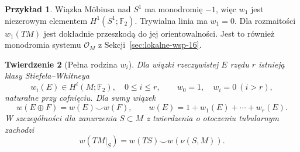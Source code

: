 \documentclass[11pt,a4paper,oneside]{report}
\theoremstyle{plain}
\newtheorem{twierdzenie}{Twierdzenie}[section]
\theoremstyle{definition}
\newtheorem{przyklad}[twierdzenie]{Przykład}
\theoremstyle{remark}
\begin{document}
\begin{przyklad}
Wiązka Möbiusa nad $S^1$
ma monodromię $-1$,
więc $w_1$ jest
niezerowym elementem
$H^1(S^1;\mathbb F_2)$.
Trywialna linia ma $w_1=0$.
Dla rozmaitości
$w_1(TM)$ jest dokładnie
przeszkodą do jej
orientowalności.
Jest to również
monodromia systemu
$\mathcal O_M$
z Sekcji~\ref{sec:lokalne-wsp-16}.
\end{przyklad}

\begin{twierdzenie}[Pełna rodzina $w_i$]
\label{thm:wi-klasy-16}
Dla wiązki rzeczywistej
$E$ rzędu $r$ istnieją
klasy Stiefela--Whitneya
\[
 w_i(E)\in H^i(M;\mathbb F_2),
 \quad 0\leq i\leq r,\qquad
 w_0=1,\quad w_i=0\ (i>r),
\]
naturalne przy cofnięciu.
Dla sumy wiązek
\[
 w(E\oplus F)=w(E)\smile w(F),
 \qquad w(E)=1+w_1(E)+\cdots+w_r(E).
\]
W szczególności dla zanurzenia
$S\subset M$ z twierdzenia o otoczeniu tubularnym
zachodzi
\begin{equation}\label{eq:w-normalne-16}
 w(TM|_S)=w(TS)\smile w(\nu(S,M)).
\end{equation}
\end{twierdzenie}
\end{document}
